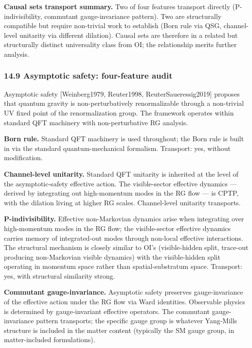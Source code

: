 \documentclass[
]{article}
\begin{document}
\textbf{Causal sets transport summary.} Two of four features transport
directly (P-indivisibility, commutant gauge-invariance pattern). Two are
structurally compatible but require non-trivial work to establish (Born
rule via QSG, channel-level unitarity via different dilation). Causal
sets are therefore in a related but structurally distinct universality
class from OI; the relationship merits further analysis.

\hypertarget{asymptotic-safety-four-feature-audit}{%
\subsubsection{14.9 Asymptotic safety: four-feature
audit}\label{asymptotic-safety-four-feature-audit}}

Asymptotic safety {[}Weinberg1979, Reuter1998, ReuterSaueressig2019{]}
proposes that quantum gravity is non-perturbatively renormalizable
through a non-trivial UV fixed point of the renormalization group. The
framework operates within standard QFT machinery with non-perturbative
RG analysis.

\textbf{Born rule.} Standard QFT machinery is used throughout; the Born
rule is built in via the standard quantum-mechanical formalism.
Transport: yes, without modification.

\textbf{Channel-level unitarity.} Standard QFT unitarity is inherited at
the level of the asymptotic-safety effective action. The visible-sector
effective dynamics --- derived by integrating out high-momentum modes in
the RG flow --- is CPTP, with the dilation living at higher RG scales.
Channel-level unitarity transports.

\textbf{P-indivisibility.} Effective non-Markovian dynamics arise when
integrating over high-momentum modes in the RG flow; the visible-sector
effective dynamics carries memory of integrated-out modes through
non-local effective interactions. The structural mechanism is closely
similar to OI's (visible-hidden split, trace-out producing non-Markovian
visible dynamics) with the visible-hidden split operating in momentum
space rather than spatial-substratum space. Transport: yes, with
structural similarity strong.

\textbf{Commutant gauge-invariance.} Asymptotic safety preserves
gauge-invariance of the effective action under the RG flow via Ward
identities. Observable physics is determined by gauge-invariant
effective operators. The commutant gauge-invariance pattern transports;
the specific gauge group is whatever Yang-Mills structure is included in
the matter content (typically the SM gauge group, in matter-included
formulations).
\end{document}
